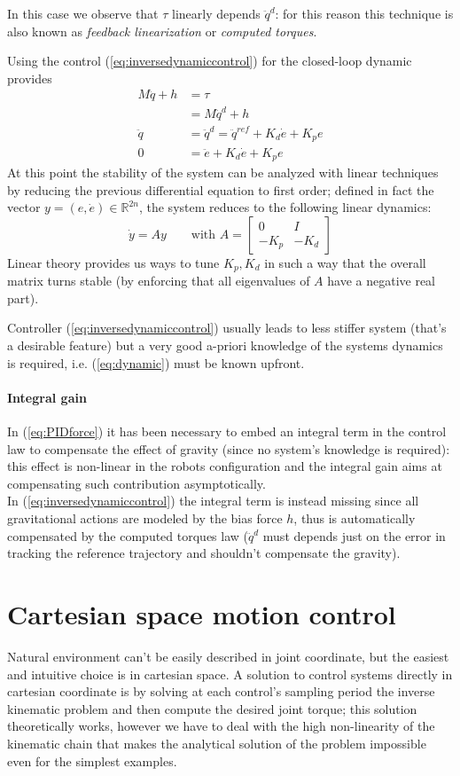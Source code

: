 	In this case we observe that $\tau$ linearly depends $\ddot q^d$: for this reason this technique is also known as \textit{feedback linearization} or \textit{computed torques}.
	
	Using the control (\ref{eq:inversedynamiccontrol}) for the closed-loop dynamic provides
	\begin{align*}
		M \ddot q + h & = \tau \\ & = M\ddot q^d + h \\
		\ddot q & = \ddot q^d = \ddot q^{ref} + K_d\dot e + K_p e \\
		0 & = \ddot e + K_d\dot e + K_p e
	\end{align*}
	At this point the stability of the system can be analyzed with linear techniques by reducing the previous differential equation to first order; defined in fact the vector $y = (e,\dot e) \in \mathds R^{2n}$, the system reduces to the following linear dynamics:
	\[ \dot y = A y \qquad \textrm{with } A  = \begin{bmatrix}
		0 & I \\ -K_p & -K_d
	\end{bmatrix}\]
	Linear theory provides us ways to tune $K_p, K_d$ in such a way that the overall matrix turns stable (by enforcing that all eigenvalues of $A$ have a negative real part).
	
	Controller (\ref{eq:inversedynamiccontrol}) usually leads to less stiffer system (that's a desirable feature) but a very good a-priori knowledge of the systems dynamics is required, i.e. (\ref{eq:dynamic}) must be known upfront.
	
	\paragraph{Integral gain} In (\ref{eq:PIDforce}) it has been necessary to embed an integral term in the control law to compensate the effect of gravity (since no system's knowledge is required): this effect is non-linear in the robots configuration and the integral gain aims at compensating such contribution asymptotically.\\
	In (\ref{eq:inversedynamiccontrol}) the integral term is instead missing since all gravitational actions are modeled by the bias force $h$, thus is automatically compensated by the computed torques law ($\ddot q^d$ must depends just on the error in tracking the reference trajectory and shouldn't compensate the gravity).
	
	
\section{Cartesian space motion control}	
	Natural environment can't be easily described in joint coordinate, but the easiest and intuitive choice is in cartesian space. A solution to control systems directly in cartesian coordinate is by solving at each control's sampling period the inverse kinematic problem and then compute the desired joint torque; this solution theoretically works, however we have to deal with the high non-linearity of the kinematic chain that makes the analytical solution of the problem impossible even for the simplest examples. 
	
